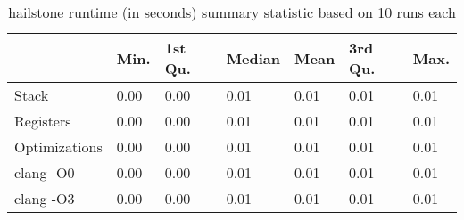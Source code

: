 \begin{table}[h!]
\centering
\begin{tabular}{p{}p{}p{}p{}p{}p{}p{}}
  \hline
 & Min. & 1st Qu. & Median & Mean & 3rd Qu. & Max. \\ 
  \hline
Stack & 0.00 & 0.00 & 0.01 & 0.01 & 0.01 & 0.01 \\ 
  Registers & 0.00 & 0.00 & 0.01 & 0.01 & 0.01 & 0.01 \\ 
  Optimizations & 0.00 & 0.00 & 0.01 & 0.01 & 0.01 & 0.01 \\ 
  clang -O0 & 0.00 & 0.00 & 0.01 & 0.01 & 0.01 & 0.01 \\ 
  clang -O3 & 0.00 & 0.00 & 0.01 & 0.01 & 0.01 & 0.01 \\ 
   \hline
\end{tabular}
\caption{hailstone runtime (in seconds) summary statistic based on 10 runs each}
\end{table}
